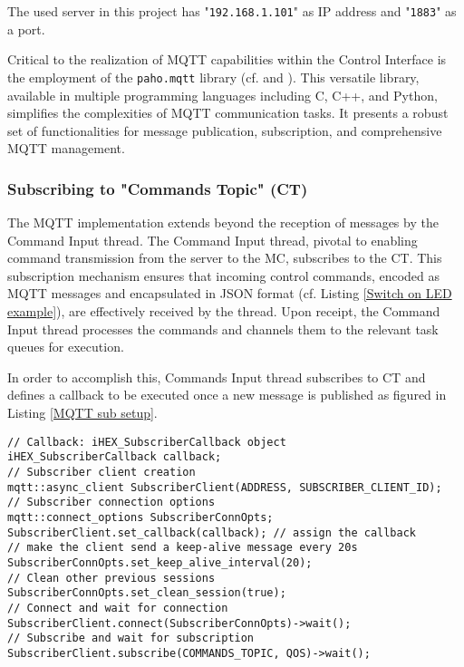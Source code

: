 The used server in this project has "\texttt{192.168.1.101}" as IP address and "\texttt{1883}" as a port.

Critical to the realization of MQTT capabilities within the Control Interface is the employment of the \texttt{paho.mqtt} library (cf. \cite{R1} and \cite{R2}). This versatile library, available in multiple programming languages including C, C++, and Python, simplifies the complexities of MQTT communication tasks. It presents a robust set of functionalities for message publication, subscription, and comprehensive MQTT management.

\subsubsection{Subscribing to "Commands Topic" (CT)}
The MQTT implementation extends beyond the reception of messages by the Command Input thread. The Command Input thread, pivotal to enabling command transmission from the server to the MC, subscribes to the CT. This subscription mechanism ensures that incoming control commands, encoded as MQTT messages and encapsulated in JSON format (cf. Listing \ref{Switch on LED example}), are effectively received by the thread. Upon receipt, the Command Input thread processes the commands and channels them to the relevant task queues for execution.

In order to accomplish this, Commands Input thread subscribes to CT and defines a callback to be executed once a new message is published as figured in Listing \ref{MQTT sub setup}.

\begin{adjustwidth}{2em}{0pt}
\begin{lstlisting}[style=cppStyle]
// Callback: iHEX_SubscriberCallback object
iHEX_SubscriberCallback callback;
// Subscriber client creation
mqtt::async_client SubscriberClient(ADDRESS, SUBSCRIBER_CLIENT_ID);
// Subscriber connection options
mqtt::connect_options SubscriberConnOpts;
SubscriberClient.set_callback(callback); // assign the callback
// make the client send a keep-alive message every 20s
SubscriberConnOpts.set_keep_alive_interval(20); 
// Clean other previous sessions
SubscriberConnOpts.set_clean_session(true);
// Connect and wait for connection
SubscriberClient.connect(SubscriberConnOpts)->wait();
// Subscribe and wait for subscription
SubscriberClient.subscribe(COMMANDS_TOPIC, QOS)->wait();
\end{lstlisting}
\captionsetup{type=lstlisting}
\label{MQTT sub setup}
\end{adjustwidth}


